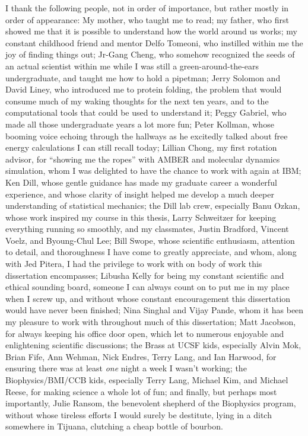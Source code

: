I thank the following people, not in order of importance, but rather mostly in order of appearance:
My mother, who taught me to read;
my father, who first showed me that it is possible to understand how the world around us works;
my constant childhood friend and mentor Delfo Tomeoni, who instilled within me the joy of finding things out;
Jr-Gang Cheng, who somehow recognized the seeds of an actual scientist within me while I was still a green-around-the-ears undergraduate, and taught me how to hold a pipetman;
Jerry Solomon and David Liney, who introduced me to protein folding, the problem that would consume much of my waking thoughts for the next ten years, and to the computational tools that could be used to understand it;
Peggy Gabriel, who made all those undergraduate years a lot more fun;
Peter Kollman, whose booming voice echoing through the hallways as he excitedly talked about free energy calculations I can still recall today;
Lillian Chong, my first rotation advisor, for ``showing me the ropes'' with AMBER and molecular dynamics simulation, whom I was delighted to have the chance to work with again at IBM;
Ken Dill, whose gentle guidance has made my graduate career a wonderful experience, and whose clarity of insight helped me develop a much deeper understanding of statistical mechanics;
the Dill lab crew, especially Banu Ozkan, whose work inspired my course in this thesis, Larry Schweitzer for keeping everything running so smoothly, and my classmates, Justin Bradford, Vincent Voelz, and Byoung-Chul Lee;
Bill Swope, whose scientific enthusiasm, attention to detail, and thoroughness I have come to greatly appreciate, and whom, along with Jed Pitera, I had the privilege to work with on body of work this dissertation encompasses;
Libusha Kelly for being my constant scientific and ethical sounding board, someone I can always count on to put me in my place when I screw up, and without whose constant encouragement this dissertation would have never been finished;
Nina Singhal and Vijay Pande, whom it has been my pleasure to work with throughout much of this dissertation;
Matt Jacobson, for always keeping his office door open, which let to numerous enjoyable and enlightening scientific discussions;
the Brass at UCSF kids, especially Alvin Mok, Brian Fife, Ann Wehman, Nick Endres, Terry Lang, and Ian Harwood, for ensuring there was at least \emph{one} night a week I wasn't working;
the Biophysics/BMI/CCB kids, especially Terry Lang, Michael Kim, and Michael Reese, for making science a whole lot of fun;
and finally, but perhaps most importantly, Julie Ransom, the benevolent shepherd of the Biophysics program, without whose tireless efforts I would surely be destitute, lying in a ditch somewhere in Tijuana, clutching a cheap bottle of bourbon. 

